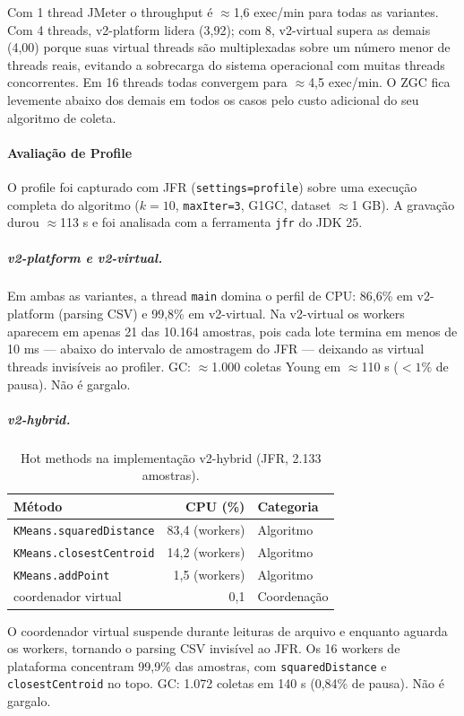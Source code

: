 Com 1 thread JMeter o throughput é $\approx$1,6 exec/min para todas as variantes.
Com 4 threads, v2-platform lidera (3,92); com 8, v2-virtual supera as demais (4,00)
porque suas virtual threads são multiplexadas sobre um número menor de threads reais,
evitando a sobrecarga do sistema operacional com muitas threads concorrentes. Em 16
threads todas convergem para $\approx$4,5 exec/min. O ZGC fica levemente abaixo dos
demais em todos os casos pelo custo adicional do seu algoritmo de coleta.

\paragraph{Avaliação de Profile}

O profile foi capturado com JFR (\texttt{settings=profile}) sobre uma execução
completa do algoritmo ($k=10$, \texttt{maxIter=3}, G1GC, dataset $\approx$1 GB).
A gravação durou $\approx$113 s e foi analisada com a ferramenta \texttt{jfr}
do JDK 25.

\subparagraph{v2-platform e v2-virtual.}
Em ambas as variantes, a thread \texttt{main} domina o perfil de CPU: 86,6\%
em v2-platform (parsing CSV) e 99,8\% em v2-virtual. Na v2-virtual os workers
aparecem em apenas 21 das 10.164 amostras, pois cada lote termina em menos de
10 ms — abaixo do intervalo de amostragem do JFR — deixando as virtual threads
invisíveis ao profiler. GC: $\approx$1.000 coletas Young em $\approx$110 s
($<1\%$ de pausa). Não é gargalo.

\subparagraph{v2-hybrid.}

\begin{table}[H]
\centering
\begin{tabular}{lrl}
\hline
\textbf{Método} & \textbf{CPU (\%)} & \textbf{Categoria} \\
\hline
\texttt{KMeans.squaredDistance}  & 83{,}4 (workers) & Algoritmo \\
\texttt{KMeans.closestCentroid}  & 14{,}2 (workers) & Algoritmo \\
\texttt{KMeans.addPoint}         &  1{,}5 (workers) & Algoritmo \\
coordenador virtual              &  0{,}1           & Coordenação \\
\hline
\end{tabular}
\caption{Hot methods na implementação v2-hybrid (JFR, 2.133 amostras).}
\label{tab:jfr-hot-v2-hybrid}
\end{table}

O coordenador virtual suspende durante leituras de arquivo e enquanto aguarda os
workers, tornando o parsing CSV invisível ao JFR. Os 16 workers de plataforma
concentram 99,9\% das amostras, com \texttt{squaredDistance} e
\texttt{closestCentroid} no topo. GC: 1.072 coletas em 140 s (0,84\% de pausa).
Não é gargalo.

